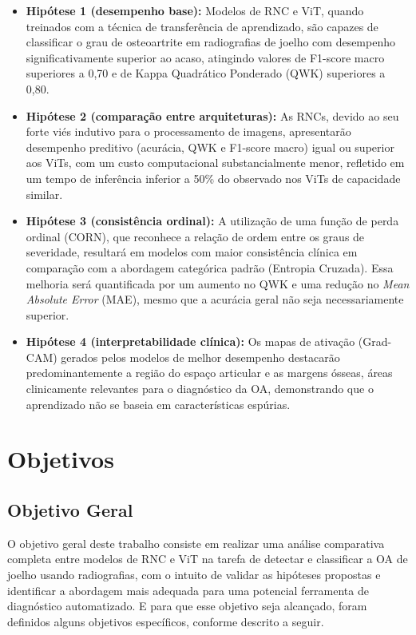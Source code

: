 \begin{itemize}
    \item \textbf{Hipótese 1 (desempenho base):} Modelos de RNC e ViT, quando treinados com a técnica de transferência de aprendizado, são capazes de classificar o grau de osteoartrite em radiografias de joelho com desempenho significativamente superior ao acaso, atingindo valores de F1-score macro superiores a 0,70 e de Kappa Quadrático Ponderado (QWK) superiores a 0,80.

    \item \textbf{Hipótese 2 (comparação entre arquiteturas):} As RNCs, devido ao seu forte viés indutivo para o processamento de imagens, apresentarão desempenho preditivo (acurácia, QWK e F1-score macro) igual ou superior aos ViTs, com um custo computacional substancialmente menor, refletido em um tempo de inferência inferior a 50\% do observado nos ViTs de capacidade similar.
    
    \item \textbf{Hipótese 3 (consistência ordinal):} A utilização de uma função de perda ordinal (CORN), que reconhece a relação de ordem entre os graus de severidade, resultará em modelos com maior consistência clínica em comparação com a abordagem categórica padrão (Entropia Cruzada). Essa melhoria será quantificada por um aumento no QWK e uma redução no \textit{Mean Absolute Error} (MAE), mesmo que a acurácia geral não seja necessariamente superior.

    \item \textbf{Hipótese 4 (interpretabilidade clínica):} Os mapas de ativação (Grad-CAM) gerados pelos modelos de melhor desempenho destacarão predominantemente a região do espaço articular e as margens ósseas, áreas clinicamente relevantes para o diagnóstico da OA, demonstrando que o aprendizado não se baseia em características espúrias.
\end{itemize}

\section{Objetivos}

\subsection{Objetivo Geral}

O objetivo geral deste trabalho consiste em realizar uma análise comparativa completa entre modelos de RNC e ViT na tarefa de detectar e classificar a OA de joelho usando radiografias, com o intuito de validar as hipóteses propostas e identificar a abordagem mais adequada para uma potencial ferramenta de diagnóstico automatizado. E para que esse objetivo seja alcançado, foram definidos alguns objetivos específicos, conforme descrito a seguir.

